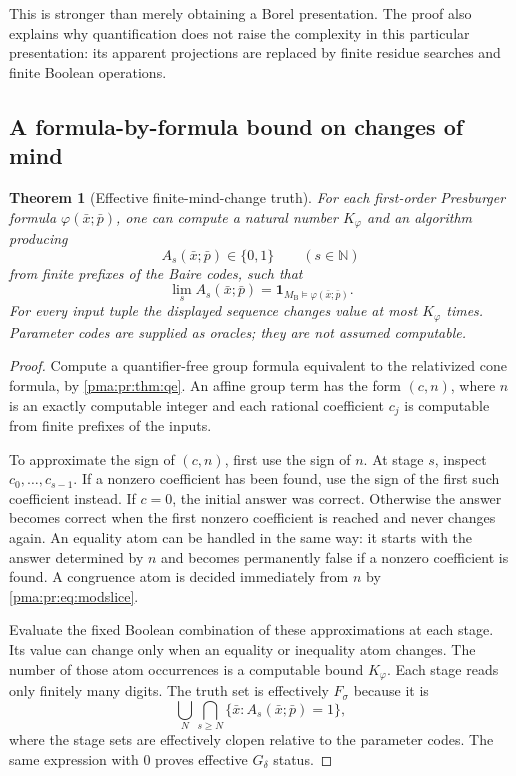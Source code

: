\documentclass[11pt]{article}
\numberwithin{equation}{section}
\newtheorem{theorem}{Theorem}[section]
\theoremstyle{definition}
\theoremstyle{remark}
\newcommand{\N}{\mathbb N}
\newcommand{\MB}{M_{\mathrm B}}
\begin{document}
This is stronger than merely obtaining a Borel presentation. The proof
also explains why quantification does not raise the complexity in this
particular presentation: its apparent projections are replaced by finite
residue searches and finite Boolean operations.

\subsection{A formula-by-formula bound on changes of mind}

\begin{theorem}[Effective finite-mind-change truth]
\label{pma:pr:thm:mindchange}
For each first-order Presburger formula $\varphi(\bar x;\bar p)$, one can
compute a natural number $K_{\varphi}$ and an algorithm producing
\[
 A_s(\bar x;\bar p)\in\{0,1\}\qquad(s\in\N)
\]
from finite prefixes of the Baire codes, such that
\[
 \lim_s A_s(\bar x;\bar p)
  =\mathbf 1_{\MB\models\varphi(\bar x;\bar p)}.
\]
For every input tuple the displayed sequence changes value at most
$K_{\varphi}$ times. Parameter codes are supplied as oracles; they are
not assumed computable.
\end{theorem}
\begin{proof}
Compute a quantifier-free group formula equivalent to the relativized
cone formula, by \cref{pma:pr:thm:qe}. An affine group term has the form
$(c,n)$, where $n$ is an exactly computable integer and each rational
coefficient $c_j$ is computable from finite prefixes of the inputs.

To approximate the sign of $(c,n)$, first use the sign of $n$. At stage
$s$, inspect $c_0,\ldots,c_{s-1}$. If a nonzero coefficient has been
found, use the sign of the first such coefficient instead. If $c=0$,
the initial answer was correct. Otherwise the answer becomes correct
when the first nonzero coefficient is reached and never changes again.
An equality atom can be handled in the same way: it starts with the
answer determined by $n$ and becomes permanently false if a nonzero
coefficient is found. A congruence atom is decided immediately from $n$
by \eqref{pma:pr:eq:modslice}.

Evaluate the fixed Boolean combination of these approximations at each
stage. Its value can change only when an equality or inequality atom
changes. The number of those atom occurrences is a computable bound
$K_{\varphi}$. Each stage reads only finitely many digits. The truth set
is effectively $F_\sigma$ because it is
\[
 \bigcup_N\bigcap_{s\geq N}\{\bar x:A_s(\bar x;\bar p)=1\},
\]
where the stage sets are effectively clopen relative to the parameter
codes. The same expression with $0$ proves effective $G_\delta$ status.
\end{proof}
\end{document}
